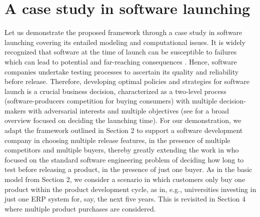 \documentclass[a4paper,fleqn, 11pt]{cas-sc}
\begin{document}
\section{A case study in software launching}\label{sec:software}


Let us demonstrate the proposed framework through a case study in software launching covering its entailed modeling and computational issues.
  It is widely recognized that software at the time of launch can be susceptible to failures which can lead to potential and far-reaching consequences
\citep{couce}.  Hence, software companies %
 undertake testing processes to ascertain its 
   quality and reliability before release. Therefore, developing optimal policies and strategies 
   for software launch is a crucial business decision, 
  characterized as a two-level process 
 (software-producers competition for buying consumers)  with multiple 
decision-makers with 
adversarial interests and multiple objectives (see \cite{ruggeri2018decision} for 
  a broad overview %
    focused on deciding the launching time).
 For our demonstration, we adapt the framework outlined in Section 2 to support 
a software development company in choosing multiple release features, in the presence of multiple competitors and multiple buyers, thereby greatly extending the work in \cite{softearlier} who 
 focused on the standard software engineering problem of deciding 
 how long to test before releasing a product, in the presence of just one buyer.  
 As in the basic model from Section 2, we 
 consider a scenario in which customers only buy one product within the product development cycle, as in, e.g., universities investing in just one 
 ERP system for, say, the next five years. This is  
   revisited in Section 4  where multiple product purchases are considered. 
 
\end{document}
